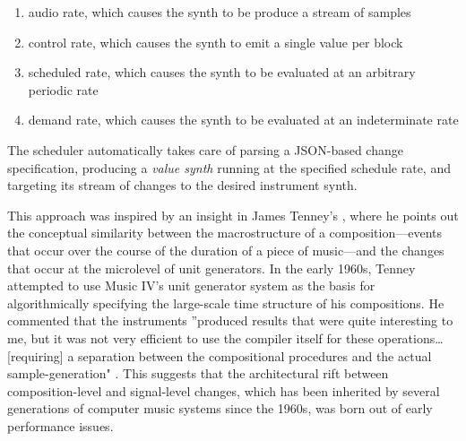 \documentclass{article}
\begin{document}
\begin{enumerate}
\item audio rate, which causes the synth to be produce a stream of samples
\item control rate, which causes the synth to emit a single value per block
\item scheduled rate, which causes the synth to be evaluated at an arbitrary periodic rate
\item demand rate, which causes the synth to be evaluated at an indeterminate rate
\end{enumerate}

The scheduler automatically takes care of parsing a JSON-based change specification, producing a {\it value synth} running at the specified schedule rate, and targeting its stream of changes to the desired instrument synth.

This approach was inspired by an insight in James Tenney's \cite{tenney1969computer}, where he points out the conceptual similarity between the macrostructure of a composition---events that occur over the course of the duration of a piece of music---and the changes that occur at the microlevel of unit generators. In the early 1960s, Tenney attempted to use Music IV's unit generator system as the basis for algorithmically specifying the large-scale time structure of his compositions. He commented that the instruments ''produced results that were quite interesting to me, but it was not very efficient to use the compiler itself for these operations\ldots [requiring] a separation between the compositional procedures and the actual sample-generation" \cite[p.41--42]{tenney1969computer}. This suggests that the architectural rift between composition-level and signal-level changes, which has been inherited by several generations of computer music systems since the 1960s, was born out of early performance issues.
\end{document}
